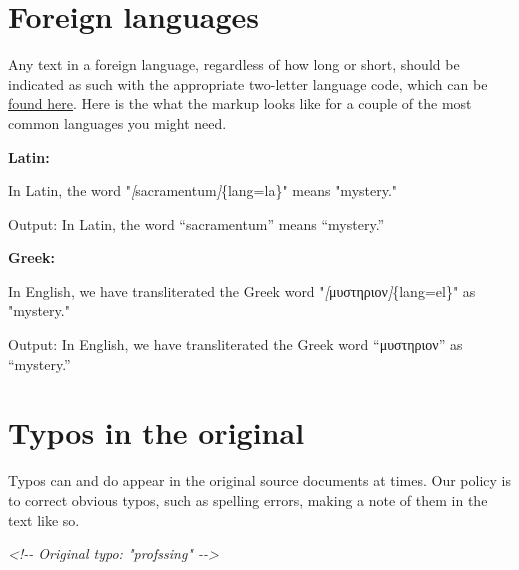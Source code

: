 \documentclass[
]{book}
\newenvironment{Shaded}{\begin{snugshade}}{\end{snugshade}}
\newcommand{\CommentTok}[1]{\textcolor[rgb]{0.56,0.35,0.01}{\textit{#1}}}
\newcommand{\NormalTok}[1]{#1}
\newcommand{\OtherTok}[1]{\textcolor[rgb]{0.56,0.35,0.01}{#1}}
\begin{document}
\hypertarget{foreign-languages}{%
\chapter{Foreign languages}\label{foreign-languages}}

Any text in a foreign language, regardless of how long or short, should be indicated as such with the appropriate two-letter language code, which can be \href{https://www.w3schools.com/tags/ref_language_codes.asp}{found here}. Here is the what the markup looks like for a couple of the most common languages you might need.

\textbf{Latin:}

\begin{Shaded}
\begin{Highlighting}[]
\NormalTok{In Latin, the word "}\CommentTok{[}\OtherTok{sacramentum}\CommentTok{]}\NormalTok{\{lang=la\}" means "mystery."}
\end{Highlighting}
\end{Shaded}

Output: In Latin, the word ``\foreignlanguage{latin}{sacramentum}'' means ``mystery.''

\textbf{Greek:}

\begin{Shaded}
\begin{Highlighting}[]
\NormalTok{In English, we have transliterated the Greek word "}\CommentTok{[}\OtherTok{μυστηριον}\CommentTok{]}\NormalTok{\{lang=el\}" as "mystery."}
\end{Highlighting}
\end{Shaded}

Output: In English, we have transliterated the Greek word ``\foreignlanguage{greek}{μυστηριον}'' as ``mystery.''

\hypertarget{typos-in-the-original}{%
\chapter{Typos in the original}\label{typos-in-the-original}}

Typos can and do appear in the original source documents at times. Our policy is to correct obvious typos, such as spelling errors, making a note of them in the text like so.

\begin{Shaded}
\begin{Highlighting}[]
\CommentTok{\textless{}!{-}{-} Original typo: "profssing" {-}{-}\textgreater{}}
\end{Highlighting}
\end{Shaded}
\end{document}
